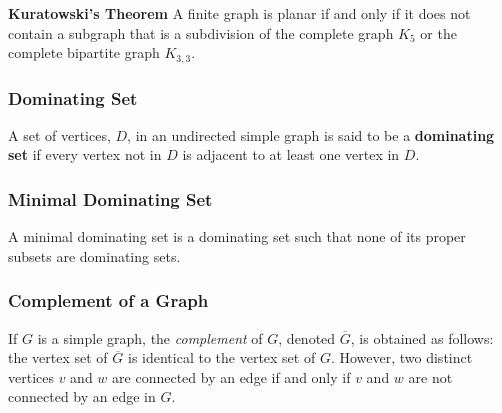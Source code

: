 \documentclass{article}
\theoremstyle{plain}
\theoremstyle{definition}
\theoremstyle{remark}
\begin{document}
\begin{center}
\end{center}
 
\textbf{Kuratowski's Theorem} A finite graph is planar if and only if it does not contain a subgraph that is a subdivision of the complete graph $K_5$ or the complete bipartite graph $K_{3,3}$.
 
\subsubsection*{Dominating Set}
A set of vertices, $D$, in an undirected simple graph is said to be a \textbf{dominating set} if every vertex not in $D$ is adjacent to at least one vertex in $D$.
 
\subsubsection*{Minimal Dominating Set}
A minimal dominating set is a dominating set such that none of its proper subsets are dominating sets.
 
\subsubsection*{Complement of a Graph}
If $G$ is a simple graph, the \emph{complement} of $G$, denoted $\overline{G}$, is obtained as follows: the vertex set of $\overline{G}$ is identical to the vertex set of $G$. However, two distinct vertices $v$ and $w$ are connected by an edge if and only if $v$ and $w$ are not connected by an edge in $G$.
 
\end{document}
